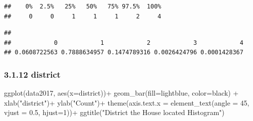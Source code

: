 \documentclass[
]{article}
\newenvironment{Shaded}{\begin{snugshade}}{\end{snugshade}}
\newcommand{\AttributeTok}[1]{\textcolor[rgb]{0.77,0.63,0.00}{#1}}
\newcommand{\DecValTok}[1]{\textcolor[rgb]{0.00,0.00,0.81}{#1}}
\newcommand{\FloatTok}[1]{\textcolor[rgb]{0.00,0.00,0.81}{#1}}
\newcommand{\FunctionTok}[1]{\textcolor[rgb]{0.00,0.00,0.00}{#1}}
\newcommand{\NormalTok}[1]{#1}
\newcommand{\SpecialCharTok}[1]{\textcolor[rgb]{0.00,0.00,0.00}{#1}}
\newcommand{\StringTok}[1]{\textcolor[rgb]{0.31,0.60,0.02}{#1}}
\begin{document}
\begin{verbatim}
##    0%  2.5%   25%   50%   75% 97.5%  100% 
##     0     0     1     1     1     2     4
\end{verbatim}

\begin{Shaded}
\end{Shaded}

\begin{verbatim}
## 
##            0            1            2            3            4 
## 0.0608722563 0.7888634957 0.1474789316 0.0026424796 0.0001428367
\end{verbatim}

\hypertarget{district}{%
\subsubsection{3.1.12 district}\label{district}}

\begin{Shaded}
\begin{Highlighting}[]
\FunctionTok{ggplot}\NormalTok{(data2017, }\FunctionTok{aes}\NormalTok{(}\AttributeTok{x=}\NormalTok{district))}\SpecialCharTok{+}
  \FunctionTok{geom\_bar}\NormalTok{(}\AttributeTok{fill=}\StringTok{\textquotesingle{}lightblue\textquotesingle{}}\NormalTok{, }\AttributeTok{color=}\StringTok{\textquotesingle{}black\textquotesingle{}}\NormalTok{) }\SpecialCharTok{+}
  \FunctionTok{xlab}\NormalTok{(}\StringTok{"district"}\NormalTok{)}\SpecialCharTok{+}
  \FunctionTok{ylab}\NormalTok{(}\StringTok{"Count"}\NormalTok{)}\SpecialCharTok{+}
  \FunctionTok{theme}\NormalTok{(}\AttributeTok{axis.text.x =} \FunctionTok{element\_text}\NormalTok{(}\AttributeTok{angle =} \DecValTok{45}\NormalTok{, }\AttributeTok{vjust =} \FloatTok{0.5}\NormalTok{, }\AttributeTok{hjust=}\DecValTok{1}\NormalTok{))}\SpecialCharTok{+}
  \FunctionTok{ggtitle}\NormalTok{(}\StringTok{"District the House located Histogram"}\NormalTok{) }
\end{Highlighting}
\end{Shaded}
\end{document}
